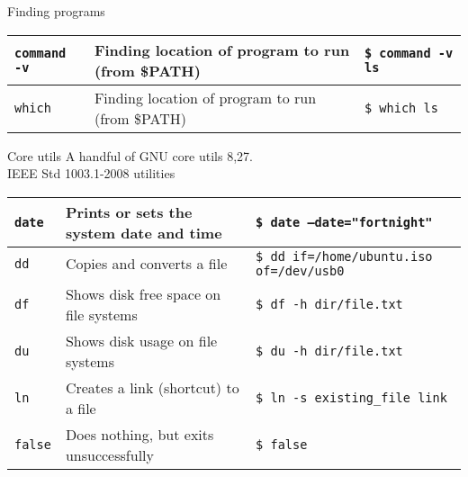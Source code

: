 \documentclass{beamer}
\let\tt\texttt
\begin{document}
\begin{frame}{Finding programs}
        \begin{tabular}{p{} p{} p{}}
                \hline
                \tt{command -v}             &
                Finding location of program to run (from \$PATH) &
                \tt{\$ command -v ls}       \\
                \hline
                \tt{which}             &
                Finding location of program to run (from \$PATH) &
                \tt{\$ which ls}       \\
                \hline
        \end{tabular}
\end{frame}

\begin{frame}{Core utils}
        A handful of GNU core utils 8,27. \\
        IEEE Std 1003.1-2008 utilities \\
        \begin{tabular}{p{} p{} p{}}
                \hline
                \tt{date}             &
                Prints or sets the system date and time &
                \tt{\$ date --date="fortnight"}       \\
                \hline
                \tt{dd}             &
                Copies and converts a file  &
                \tt{\$ dd if=/home/ubuntu.iso of=/dev/usb0}       \\
                \hline
                \tt{df}             &
                Shows disk free space on file systems   &
                \tt{\$ df -h dir/file.txt}       \\
                \hline
                \tt{du}             &
                Shows disk usage on file systems &
                \tt{\$ du -h dir/file.txt}       \\
                \hline
                \tt{ln}             &
                Creates a link (shortcut) to a file &
                \tt{\$ ln -s existing\_file link}       \\
                \hline
                \tt{false}             &
                Does nothing, but exits unsuccessfully &
                \tt{\$ false}       \\
                \hline
        \end{tabular}
\end{frame}
\end{document}
